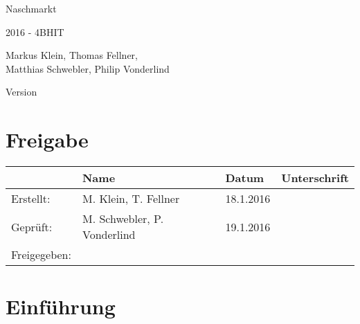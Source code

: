 \documentclass[12pt, letterpaper]{report}
\begin{document}
	\begin{titlepage}
		\begin{center}
			\vspace*{1cm}

			{\fontsize{25}{25} Naschmarkt\\}
            \vspace{0.3cm}
            {\fontsize{25}{25}}

			\vspace{2.5cm}

			2016 - 4BHIT

			\vspace*{5mm}

			\small{Markus Klein, Thomas Fellner,\\Matthias Schwebler, Philip Vonderlind}

			\vspace*{2cm}

			Version \version

			\vfill

			\chapter*{Freigabe}
			\begin{center}
				\begin{tabu} to 
					\hline
					& Name & Datum & Unterschrift \\ \hline
					Erstellt: & M. Klein, T. Fellner & 18.1.2016 & \\ \hline
					Gepr\"uft: & M. Schwebler, P. Vonderlind & 19.1.2016 & \\ \hline
					Freigegeben: &  &  & \\
					\hline
				\end{tabu}
			\end{center}

		\end{center}
	\end{titlepage}


	\newpage
	\tableofcontents


	\newpage
	\chapter*{Einf\"uhrung}
\end{document}
